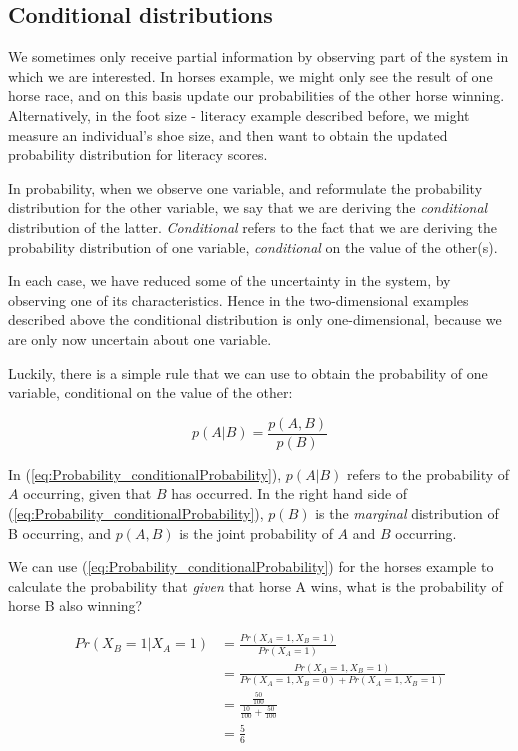 \documentclass[11pt,fullpage]{book}
\begin{document}
\subsection{Conditional distributions}\label{sec:Probability_conditionalDistributionIntro}
We sometimes only receive partial information by observing part of the system in which we are interested. In horses example, we might only see the result of one horse race, and on this basis update our probabilities of the other horse winning. Alternatively, in the foot size - literacy example described before, we might measure an individual's shoe size, and then want to obtain the updated probability distribution for literacy scores.

In probability, when we observe one variable, and reformulate the probability distribution for the other variable, we say that we are deriving the \textit{conditional} distribution of the latter. \textit{Conditional} refers to the fact that we are deriving the probability distribution of one variable, \textit{conditional} on the value of the other(s).

In each case, we have reduced some of the uncertainty in the system, by observing one of its characteristics. Hence in the two-dimensional examples described above the conditional distribution is only one-dimensional, because we are only now uncertain about one variable. 

Luckily, there is a simple rule that we can use to obtain the probability of one variable, conditional on the value of the other:

\begin{equation}\label{eq:Probability_conditionalProbability}
p(A|B) = \frac{p(A,B)}{p(B)}
\end{equation}

In (\ref{eq:Probability_conditionalProbability}), $p(A|B)$ refers to the probability of $A$ occurring, given that $B$ has occurred. In the right hand side of (\ref{eq:Probability_conditionalProbability}), $p(B)$ is the \textit{marginal} distribution of B occurring, and $p(A,B)$ is the joint probability of $A$ and $B$ occurring.

We can use (\ref{eq:Probability_conditionalProbability}) for the horses example to calculate the probability that \textit{given} that horse A wins, what is the probability of horse B also winning?

\begin{equation}\label{eq:Probability_conditionalDiscreteCoins}
\begin{align}
Pr(X_B=1|X_A=1) &= \frac{Pr(X_A=1,X_B=1)}{Pr(X_A=1)}\\
&= \frac{Pr(X_A=1,X_B=1)}{Pr(X_A=1,X_B=0)+Pr(X_A=1,X_B=1)}\\
&= \frac{\frac{50}{100}}{\frac{10}{100} + \frac{50}{100}}\\ 
&= \frac{5}{6}
\end{align}
\end{equation}
\end{document}
